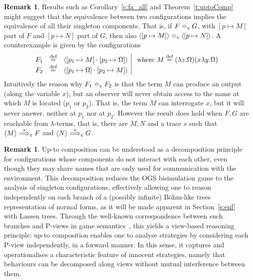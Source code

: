 \documentclass[11pt,a4paper]{amsart}
\theoremstyle{plain}
\theoremstyle{definition}
\theoremstyle{defC}
\theoremstyle{thmC}
\theoremstyle{plain}
\numberwithin{equation}{section}
\newcommand{\rmm}[1]{{\tt{\lowercase{#1}}}}
\newcommand{\genArr}[2]{\mathrel{\stackrel{{#1}}{\Longrightarrow}_{\rmm{\lowercase{#2}}}}}  %
\newcommand{\ArrC}[1]{\genArr{#1}{C}}   %
\newcommand{\genTE}[1]{\mathrel{\bumpeq_{\rmm{\lowercase{#1}}}}}       %
\newcommand{\TEp}{\genTE{C}}       %
\def\defi{\stackrel{\mbox{\scriptsize {\rm{def}}}}{=}} %
\newcommand{\FF}{F}
\newcommand{\GG}{G}
\newcommand{\pmap}[2]{[#1 \mapsto #2]}
\newcommand{\conf}[1]{\langle #1\rangle}
\theoremstyle{plain}
\theoremstyle{definition}
\newtheorem{remark}[thm]{Remark}
\begin{document}
\begin{remark}
\label{r:CONFnoSINGL} 
Results such as Corollary~\ref{c:fa_all} and 
Theorem~\ref{t:uptoComp} might suggest that the equivalence between
two configurations implies the equivalence of all their singleton 
components. That is, if $\FF \TEp \GG$, with 
$\pmap{p}{M}$ part of $\FF$ and $\pmap{p}{N}$ part of $\GG$, 
then also $\conf {\pmap{p}{M}} \TEp \conf {\pmap{p}{N} }$. 
A counterexample is given by the configurations 
$$
\begin{array}{rcl|l}
\FF_1 & \defi & \conf{ \pmap{p_1}{M}\cdot \pmap{p_2}{\Omega} } 
& \text{ where } M \defi (\lambda z. \Omega)(x \lambda y . \Omega) \\
\FF_2 & \defi & \conf{ \pmap{p_1}{\Omega}\cdot \pmap{p_2}{M} }
& 
\end{array}
 $$ 
Intuitively the reason why $\FF_1 \TEp \FF_2$  is that
the term $M$ can produce an output (along the variable $x$), 
 but an observer  will
never obtain access to  the  name at which $M$ is located
($p_1$ or $p_2$).
That is, the term $M$ can interrogate $x$,
but it will never answer,  neither at $p_1$ nor at $p_2$.
%
However the result does hold when $\FF,\GG$ are reachable from
$\lambda$-terms, that is, there are $M,N$ and a trace $s $ such
that $\conf M \ArrC s  \FF$ and $\conf N \ArrC s \GG$. 
\end{remark} 

\begin{remark}
  \label{rm:up-to-comp-gs}
  Up-to composition can be understood as a decomposition principle for configurations 
  whose components do not interact with each other, even though they may share names 
  that are only used for communication with the environment. 
  This decomposition reduces the OGS bisimulation game to the analysis of singleton configurations, 
  effectively allowing one to reason independently on each branch of a (possibly infinite) 
  Böhm-like trees representation of normal forms, as it will be
  made apparent in Section~\ref{s:enf} with Lassen trees. 
  Through the well-known correspondence between such branches and P-views in game semantics~\cite{curien1998abstract}, 
  this yields a view-based reasoning principle: up-to composition enables one to analyse strategies 
  by considering each P-view independently, in a forward manner. 
  In this sense, it captures and operationalises a characteristic feature of innocent strategies, 
  namely that behaviours can be decomposed along views without mutual interference between them.
\end{remark}
\end{document}
